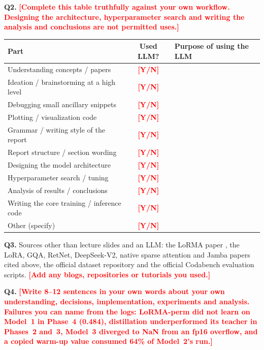 \documentclass[11pt, oneside]{article}
\newcommand{\todo}[1]{\textcolor{red}{\textbf{[#1]}}}
\begin{document}
\medskip
\noindent
\textbf{Q2.} \todo{Complete this table truthfully against your own workflow. Designing the architecture, hyperparameter search and writing the analysis and conclusions are not permitted uses.}
\begin{table}[H]
\centering
\small
\begin{tabular}{>{\raggedright\arraybackslash}p{4.6cm}|c|>{\raggedright\arraybackslash}p{7.2cm}}
\toprule
Part & Used LLM? & Purpose of using the LLM \\
\midrule
Understanding concepts / papers & \todo{Y/N} & \\
Ideation / brainstorming at a high level & \todo{Y/N} & \\
Debugging small ancillary snippets & \todo{Y/N} & \\
Plotting / visualization code & \todo{Y/N} & \\
Grammar / writing style of the report & \todo{Y/N} & \\
Report structure / section wording & \todo{Y/N} & \\
Designing the model architecture & \todo{Y/N} & \\
Hyperparameter search / tuning & \todo{Y/N} & \\
Analysis of results / conclusions & \todo{Y/N} & \\
Writing the core training / inference code & \todo{Y/N} & \\
Other (specify) & \todo{Y/N} & \\
\bottomrule
\end{tabular}
\end{table}

\noindent
\textbf{Q3.} Sources other than lecture slides and an LLM: the LoRMA paper \cite{bihany2025lorma}, the LoRA, GQA, RetNet, DeepSeek-V2, native sparse attention and Jamba papers cited above, the official dataset repository and the official Codabench evaluation scripts. \todo{Add any blogs, repositories or tutorials you used.}

\medskip
\noindent
\textbf{Q4.} \todo{Write 8--12 sentences in your own words about your own understanding, decisions, implementation, experiments and analysis. Failures you can name from the logs: LoRMA-perm did not learn on Model~1 in Phase~4 (0.484), distillation underperformed its teacher in Phases~2 and~3, Model~3 diverged to NaN from an fp16 overflow, and a copied warm-up value consumed 64\% of Model~2's run.}



\end{document}
